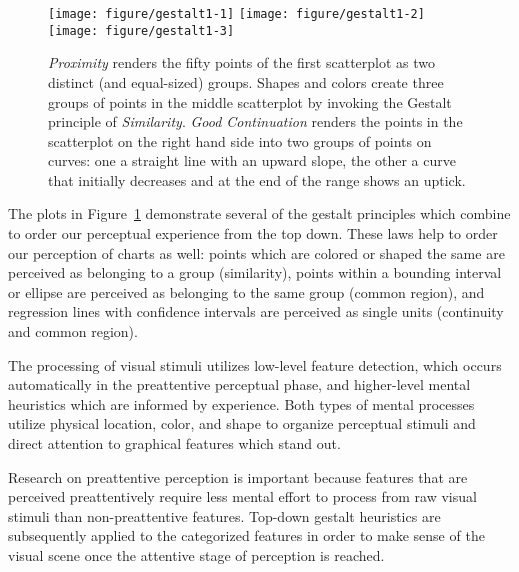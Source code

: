 \documentclass[12pt]{article}\usepackage[]{graphicx}\usepackage[]{color}
\newenvironment{knitrout}{}{} %
\begin{document}
\begin{figure}\centering
\begin{knitrout}
\color{fgcolor}

{\centering \texttt{[image: figure/gestalt1-1]} 
\texttt{[image: figure/gestalt1-2]} 
\texttt{[image: figure/gestalt1-3]} 

}



\end{knitrout}
\caption[Gestalt principles applied to statistical plots]{\label{fig:gestalt} \emph{Proximity} renders the fifty points of the first scatterplot as two distinct (and equal-sized) groups. Shapes and colors create three groups of points in the middle scatterplot by invoking the Gestalt principle of \emph{Similarity}. \emph{Good Continuation} renders the points in the scatterplot on the right hand side into two groups of points on curves: one a straight line with an upward slope, the other a curve that initially decreases and at the end of the range shows an uptick.}
\end{figure}

The plots in Figure~\ref{fig:gestalt} demonstrate several of the gestalt principles which combine to order our perceptual experience from the top down. These laws help to order our perception of charts as well: points which are colored or shaped the same are perceived as belonging to a group (similarity), points within a bounding interval or ellipse are perceived as belonging to the same group (common region), and regression lines with confidence intervals are perceived as single units (continuity and common region). 

The processing of visual stimuli utilizes low-level feature detection, which occurs automatically in the preattentive perceptual phase, and higher-level mental heuristics which are informed by experience. Both types of mental processes utilize physical location, color, and shape  to organize perceptual stimuli and direct attention to graphical features which stand out. 

Research on preattentive perception is important because features that are perceived preattentively require less mental effort to process from raw visual stimuli than non-preattentive features. Top-down gestalt heuristics are subsequently applied to the categorized features in order to make sense of the visual scene once the attentive stage of perception is reached. 
\end{document}
